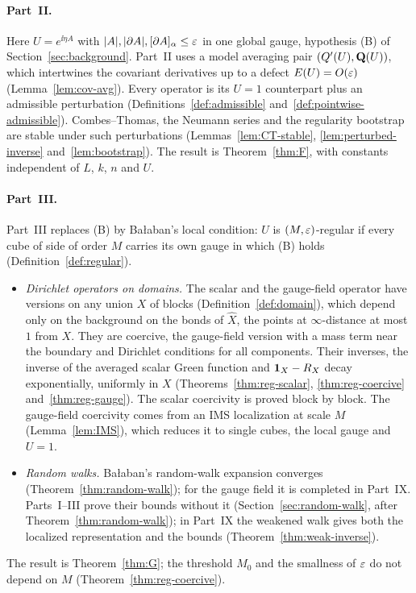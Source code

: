 \paragraph{Part~II.} Here $U=e^{\ii\eta A}$ with $|A|,|\partial A|,[\partial A]_\alpha\le\varepsilon$ in one global gauge, hypothesis (B) of Section~\ref{sec:background}. Part~II uses a model averaging pair $(Q'(U),\mathbf Q(U))$, which intertwines the covariant derivatives up to a defect $E(U)=O(\varepsilon)$ (Lemma~\ref{lem:cov-avg}). Every operator is its $U=1$ counterpart plus an admissible perturbation (Definitions~\ref{def:admissible} and~\ref{def:pointwise-admissible}). Combes--Thomas, the Neumann series and the regularity bootstrap are stable under such perturbations (Lemmas~\ref{lem:CT-stable}, \ref{lem:perturbed-inverse} and~\ref{lem:bootstrap}). The result is Theorem~\ref{thm:F}, with constants independent of $L$, $k$, $n$ and $U$.

\paragraph{Part~III.} Part~III replaces (B) by Ba\l aban's local condition: $U$ is $(M,\varepsilon)$-regular if every cube of side of order $M$ carries its own gauge in which (B) holds (Definition~\ref{def:regular}).
\begin{itemize}
\item \emph{Dirichlet operators on domains.} The scalar and the gauge-field operator have versions on any union $X$ of blocks (Definition~\ref{def:domain}), which depend only on the background on the bonds of $\hat X$, the points at $\infty$-distance at most $1$ from $X$. They are coercive, the gauge-field version with a mass term near the boundary and Dirichlet conditions for all components. Their inverses, the inverse of the averaged scalar Green function and $\mathbf 1_X-R_X$ decay exponentially, uniformly in $X$ (Theorems~\ref{thm:reg-scalar}, \ref{thm:reg-coercive} and~\ref{thm:reg-gauge}). The scalar coercivity is proved block by block. The gauge-field coercivity comes from an IMS localization at scale $M$ (Lemma~\ref{lem:IMS}), which reduces it to single cubes, the local gauge and $U=1$.
\item \emph{Random walks.} Ba\l aban's random-walk expansion converges (Theorem~\ref{thm:random-walk}); for the gauge field it is completed in Part~IX. Parts~I--III prove their bounds without it (Section~\ref{sec:random-walk}, after Theorem~\ref{thm:random-walk}); in Part~IX the weakened walk gives both the localized representation and the bounds (Theorem~\ref{thm:weak-inverse}).
\end{itemize}
The result is Theorem~\ref{thm:G}; the threshold $M_0$ and the smallness of $\varepsilon$ do not depend on $M$ (Theorem~\ref{thm:reg-coercive}).

